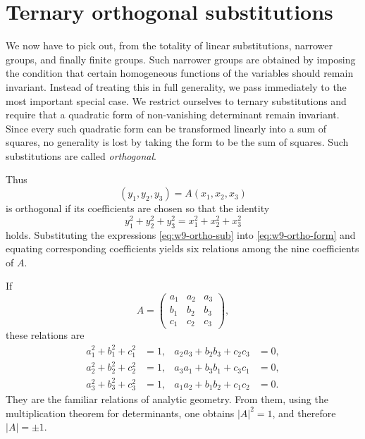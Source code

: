 \documentclass[11pt,a4paper]{book}
\begin{document}
\section{Ternary orthogonal substitutions}

We now have to pick out, from the totality of linear substitutions, narrower groups, and finally finite groups.  Such narrower groups are obtained by imposing the condition that certain homogeneous functions of the variables should remain invariant.  Instead of treating this in full generality, we pass immediately to the most important special case.  We restrict ourselves to ternary substitutions and require that a quadratic form of non-vanishing determinant remain invariant.  Since every such quadratic form can be transformed linearly into a sum of squares, no generality is lost by taking the form to be the sum of squares.  Such substitutions are called \emph{orthogonal}.

Thus
\begin{equation}\label{eq:w9-ortho-sub}
 (y_1,y_2,y_3)=A(x_1,x_2,x_3)
\end{equation}
is orthogonal if its coefficients are chosen so that the identity
\begin{equation}\label{eq:w9-ortho-form}
 y_1^2+y_2^2+y_3^2=x_1^2+x_2^2+x_3^2
\end{equation}
holds.  Substituting the expressions \eqref{eq:w9-ortho-sub} into \eqref{eq:w9-ortho-form} and equating corresponding coefficients yields six relations among the nine coefficients of $A$.

If
\begin{equation}\label{eq:w9-Aabc}
 A=\begin{pmatrix}
 a_1&a_2&a_3\\
 b_1&b_2&b_3\\
 c_1&c_2&c_3
 \end{pmatrix},
\end{equation}
these relations are
\begin{equation}\label{eq:w9-orthorel}
\begin{aligned}
 a_1^2+b_1^2+c_1^2&=1,&
 a_2a_3+b_2b_3+c_2c_3&=0,\\
 a_2^2+b_2^2+c_2^2&=1,&
 a_3a_1+b_3b_1+c_3c_1&=0,\\
 a_3^2+b_3^2+c_3^2&=1,&
 a_1a_2+b_1b_2+c_1c_2&=0.
\end{aligned}
\end{equation}
They are the familiar relations of analytic geometry.  From them, using the multiplication theorem for determinants, one obtains $|A|^2=1$, and therefore $|A|=\pm1$.
\end{document}
